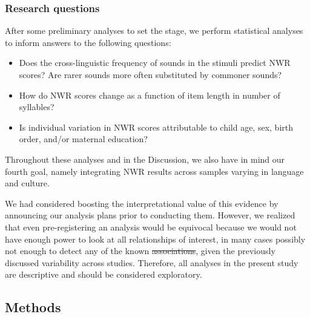 \documentclass[english,,man,floatsintext]{apa6} %
\providecommand{\tightlist}{%
	\setlength{\itemsep}{0pt}\setlength{\parskip}{0pt}}
\providecommand{\DIFaddtex}[1]{{\protect\color{blue}\uwave{#1}}} %
\providecommand{\DIFdeltex}[1]{{\protect\color{red}\sout{#1}}}                      %
\providecommand{\DIFaddbegin}{} %
\providecommand{\DIFaddend}{} %
\providecommand{\DIFdelbegin}{} %
\providecommand{\DIFdelend}{} %
\providecommand{\DIFadd}[1]{\texorpdfstring{\DIFaddtex{#1}}{#1}} %
\providecommand{\DIFdel}[1]{\texorpdfstring{\DIFdeltex{#1}}{}} %
\newcommand{\DIFscaledelfig}{0.5}
\newlength{\DIFdelgraphicswidth} %
\newlength{\DIFdelgraphicsheight} %
\newcommand{\DIFaddincludegraphics}[2][]{{\color{blue}\fbox{\DIFOincludegraphics[#1]{#2}}}} %
\newcommand{\DIFdelincludegraphics}[2][]{%
	\sbox{\DIFdelgraphicsbox}{\DIFOincludegraphics[#1]{#2}}%
	\settoboxwidth{\DIFdelgraphicswidth}{\DIFdelgraphicsbox} %
	\settoboxtotalheight{\DIFdelgraphicsheight}{\DIFdelgraphicsbox} %
	\scalebox{\DIFscaledelfig}{%
		\parbox[b]{\DIFdelgraphicswidth}{\usebox{\DIFdelgraphicsbox}\\[-\baselineskip] \rule{\DIFdelgraphicswidth}{0em}}\llap{\resizebox{\DIFdelgraphicswidth}{\DIFdelgraphicsheight}{%
				\setlength{\unitlength}{\DIFdelgraphicswidth}%
				\begin{picture}(1,1)%
				\thicklines\linethickness{2pt} %
				{\color[rgb]{1,0,0}\put(0,0){\framebox(1,1){}}}%
				{\color[rgb]{1,0,0}\put(0,0){\line( 1,1){1}}}%
				{\color[rgb]{1,0,0}\put(0,1){\line(1,-1){1}}}%
				\end{picture}%
			}\hspace*{3pt}}} %
} %
\DeclareRobustCommand{\DIFaddbegin}{\DIFOaddbegin \let\includegraphics\DIFaddincludegraphics} %
\DeclareRobustCommand{\DIFaddend}{\DIFOaddend \let\includegraphics\DIFOincludegraphics} %
\DeclareRobustCommand{\DIFdelbegin}{\DIFOdelbegin \let\includegraphics\DIFdelincludegraphics} %
\DeclareRobustCommand{\DIFdelend}{\DIFOaddend \let\includegraphics\DIFOincludegraphics} %
\begin{document}
\DIFaddend \hypertarget{research-questions}{%
	\subsubsection{Research questions}\label{research-questions}}

After some preliminary analyses to set the stage, we perform statistical analyses to inform answers to the following questions:

\begin{itemize}
	\tightlist
	\item
	Does the cross-linguistic frequency of sounds in the stimuli predict NWR scores? Are rarer sounds more often substituted by commoner sounds?
	\item
	How do NWR scores change as a function of item length in number of syllables?
	\item
	Is individual variation in NWR scores attributable to child age, sex, birth order, and/or maternal education?
\end{itemize}

Throughout these analyses and in the Discussion, we \DIFaddbegin \DIFadd{will }\DIFaddend also have in mind our fourth goal, namely integrating NWR results across samples varying in language and culture.

We had considered boosting the interpretational value of this evidence by announcing our analysis plans prior to conducting them. However, we realized that even pre-registering an analysis would be equivocal because we would not have enough power to look at all relationships of interest, in many cases possibly not enough to detect any of the known \DIFdelbegin \DIFdel{associations}\DIFdelend \DIFaddbegin \DIFadd{effects}\DIFaddend , given the previously discussed variability across studies. Therefore, all analyses in the present study are descriptive and should be considered exploratory.

\hypertarget{methods}{%
	\subsection{Methods}\label{methods}}

\DIFdelbegin %
\end{document}
